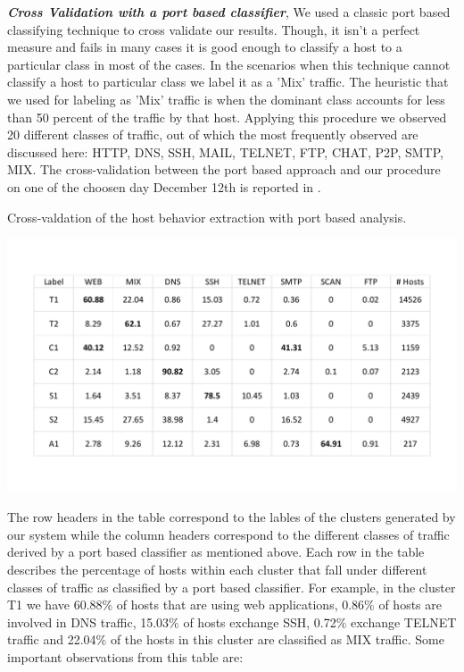 \textbf{\textit{Cross Validation with a port based classifier}}, We used a classic port based classifying technique to cross validate our results. Though, it isn't a perfect measure and fails in many cases it is good enough to classify a host to a particular class in most of the cases.
In the scenarios when this technique cannot classify a host to particular class we label it as a 'Mix' traffic. The heuristic that we used for labeling as 'Mix' traffic is when the dominant class accounts for less than 50 percent of the traffic by that host. Applying this procedure we observed 20 different classes of traffic, out of which the most frequently observed are discussed here: HTTP, DNS, SSH, MAIL, TELNET, FTP, CHAT, P2P, SMTP, MIX. The cross-validation between the port based approach and  our procedure on one of the choosen day December 12th is reported in .

\begin{table}[b]
	\caption{Cross-valdation of the host behavior extraction with port based analysis.}%
	\centerline{\includegraphics[scale = 0.5]{validation.pdf}}	
\end{table}

The row headers in the table correspond to the lables of the clusters generated by our system while the column headers correspond to the different classes of traffic derived by a port based classifier as mentioned above. Each row in the table describes the percentage of hosts within each cluster that fall under different classes of traffic as classified by a port based classifier. For example, in the cluster T1 we have 60.88\% of hosts that are using web applications, 0.86\% of hosts are involved in DNS traffic, 15.03\% of hosts exchange SSH, 0.72\% exchange TELNET traffic and 22.04\% of the hosts in this cluster are classified as MIX traffic. Some important observations from this table are:


